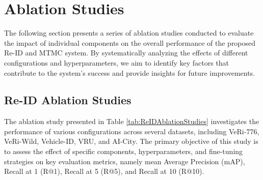 \section{Ablation Studies}
The following section presents a series of ablation studies conducted to evaluate the impact of individual components on the overall performance of the proposed Re-ID and MTMC system. By systematically analyzing the effects of different configurations and hyperparameters, we aim to identify key factors that contribute to the system's success and provide insights for future improvements.

\subsection{Re-ID Ablation Studies}
The ablation study presented in Table \ref{tab:ReIDAblationStudies} investigates the performance of various configurations across several datasets, including VeRi-776, VeRi-Wild, Vehicle-ID, VRU, and AI-City. The primary objective of this study is to assess the effect of specific components, hyperparameters, and fine-tuning strategies on key evaluation metrics, namely mean Average Precision (mAP), Recall at 1 (R@1), Recall at 5 (R@5), and Recall at 10 (R@10).


